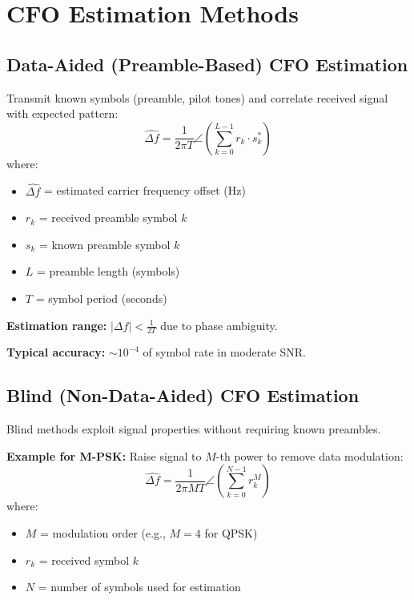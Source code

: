 \section{CFO Estimation Methods}

\subsection{Data-Aided (Preamble-Based) CFO Estimation}

Transmit known symbols (preamble, pilot tones) and correlate received signal with expected pattern:
\begin{equation}
\hat{\Delta f} = \frac{1}{2\pi T} \angle \left(\sum_{k=0}^{L-1} r_k \cdot s_k^*\right)
\end{equation}
where:
\begin{itemize}
\item $\hat{\Delta f}$ = estimated carrier frequency offset (Hz)
\item $r_k$ = received preamble symbol $k$
\item $s_k$ = known preamble symbol $k$
\item $L$ = preamble length (symbols)
\item $T$ = symbol period (seconds)
\end{itemize}

\textbf{Estimation range:} $|\Delta f| < \frac{1}{2T}$ due to phase ambiguity.

\textbf{Typical accuracy:} $\sim 10^{-4}$ of symbol rate in moderate SNR.

\subsection{Blind (Non-Data-Aided) CFO Estimation}

Blind methods exploit signal properties without requiring known preambles.

\textbf{Example for M-PSK:} Raise signal to $M$-th power to remove data modulation:
\begin{equation}
\hat{\Delta f} = \frac{1}{2\pi M T} \angle \left(\sum_{k=0}^{N-1} r_k^M\right)
\end{equation}
where:
\begin{itemize}
\item $M$ = modulation order (e.g., $M=4$ for QPSK)
\item $r_k$ = received symbol $k$
\item $N$ = number of symbols used for estimation
\end{itemize}

